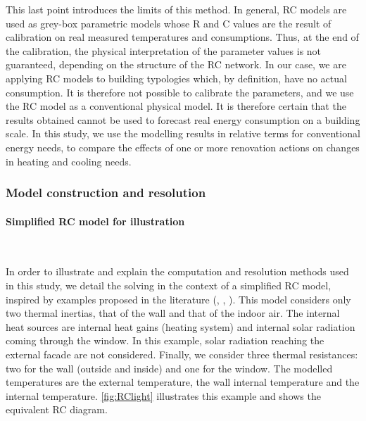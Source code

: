 \documentclass[11pt]{article}
\begin{document}
        This last point introduces the limits of this method. In general, RC models are used as grey-box parametric models whose R and C values are the result of calibration on real measured temperatures and consumptions. Thus, at the end of the calibration, the physical interpretation of the parameter values is not guaranteed, depending on the structure of the RC network. In our case, we are applying RC models to building typologies which, by definition, have no actual consumption. It is therefore not possible to calibrate the parameters, and we use the RC model as a conventional physical model. It is therefore certain that the results obtained cannot be used to forecast real energy consumption on a building scale. In this study, we use the modelling results in relative terms for conventional energy needs, to compare the effects of one or more renovation actions on changes in heating and cooling needs.  
        

        \subsubsection{Model construction and resolution} %
        \label{ssub:model_construction}

        \paragraph{Simplified RC model for illustration}\mbox{}\\ %
        \label{par:simplified_rc_model}

        In order to illustrate and explain the computation and resolution methods used in this study, we detail the solving in the context of a simplified RC model, inspired by examples proposed in the literature (\cite{madsen_estimation_1995}, \cite{bacher_identifying_2011}, \cite{rouchier_solving_2018}). This model considers only two thermal inertias, that of the wall and that of the indoor air. The internal heat sources are internal heat gains (heating system) and internal solar radiation coming through the window. In this example, solar radiation reaching the external facade are not considered. Finally, we consider three thermal resistances: two for the wall (outside and inside) and one for the window. The modelled temperatures are the external temperature, the wall internal temperature and the internal temperature. \ref{fig:RClight} illustrates this example and shows the equivalent RC diagram. 
\end{document}
